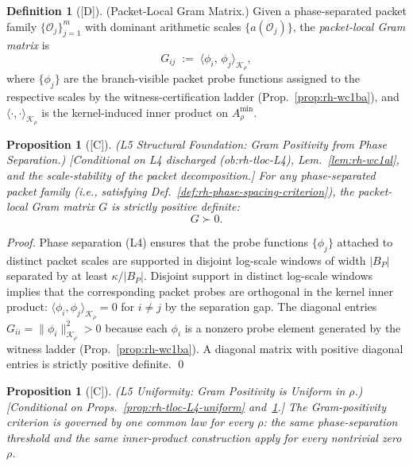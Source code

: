 \documentclass[12pt,oneside]{amsbook}
\theoremstyle{plain}
\newtheorem{proposition}[theorem]{Proposition}
\theoremstyle{definition}
\newtheorem{definition}[theorem]{Definition}
\theoremstyle{remark}
\newcommand{\status}[1]{\textup{[#1]}}
\begin{document}

\begin{definition}[\status{D}]\label{def:rh-gram-matrix}
\textup{(Packet-Local Gram Matrix.)}
Given a phase-separated packet family $\{\mathcal{O}_j\}_{j=1}^m$
with dominant arithmetic scales $\{a(\mathcal{O}_j)\}$, the
\emph{packet-local Gram matrix} is
\[
 G_{ij} \;:=\;
 \bigl\langle \phi_i,\, \phi_j \bigr\rangle_{\mathcal{K}_\rho},
\]
where $\{\phi_j\}$ are the branch-visible packet probe functions
assigned to the respective scales by the witness-certification ladder
(Prop.~\ref{prop:rh-wc1ba}), and $\langle\cdot,\cdot\rangle_{\mathcal{K}_\rho}$
is the kernel-induced inner product on $A_\rho^{\min}$.
\end{definition}

\begin{proposition}[\status{C}]\label{prop:rh-tloc-L5-structural}
\textup{(L5 Structural Foundation: Gram Positivity from Phase Separation.)}
\textup{[Conditional on L4 discharged (ob:rh-tloc-L4),
Lem.~\ref{lem:rh-wc1al}, and the scale-stability of
the packet decomposition.]}
For any phase-separated packet family (i.e., satisfying
Def.~\ref{def:rh-phase-spacing-criterion}), the packet-local Gram
matrix $G$ is strictly positive definite:
\[
 G \succ 0.
\]
\end{proposition}

\begin{proof}
Phase separation (L4) ensures that the probe functions $\{\phi_j\}$
attached to distinct packet scales are supported in disjoint
log-scale windows of width $|B_P|$ separated by at least
$\kappa/|B_P|$. Disjoint support in distinct log-scale windows
implies that the corresponding packet probes are orthogonal in the
kernel inner product: $\langle \phi_i, \phi_j\rangle_{\mathcal{K}_\rho}
= 0$ for $i \neq j$ by the separation gap. The diagonal entries
$G_{ii} = \|\phi_i\|^2_{\mathcal{K}_\rho} > 0$ because each
$\phi_i$ is a nonzero probe element generated by the witness
ladder (Prop.~\ref{prop:rh-wc1ba}). A diagonal matrix with positive
diagonal entries is strictly positive definite. \qed
\end{proof}

\begin{proposition}[\status{C}]\label{prop:rh-tloc-L5-uniform}
\textup{(L5 Uniformity: Gram Positivity is Uniform in $\rho$.)}
\textup{[Conditional on Props.~\ref{prop:rh-tloc-L4-uniform}
and~\ref{prop:rh-tloc-L5-structural}.]}
The Gram-positivity criterion is governed by one common law for every
$\rho$: the same phase-separation threshold and the same inner-product
construction apply for every nontrivial zero $\rho$.
\end{proposition}
\end{document}
